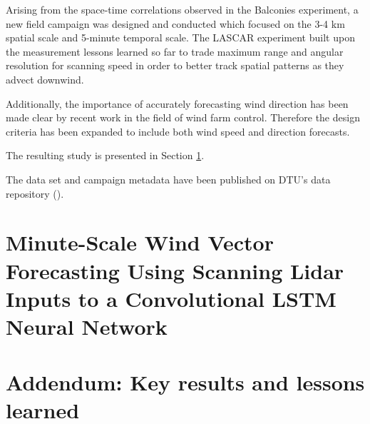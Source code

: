 Arising from the space-time correlations observed in the Balconies experiment, a new field campaign was designed and conducted which focused on the 3-4 km spatial scale and 5-minute temporal scale. The LASCAR experiment built upon the measurement lessons learned so far to trade maximum range and angular resolution for scanning speed in order to better track spatial patterns as they advect downwind.

Additionally, the importance of accurately forecasting wind direction has been made clear by recent work in the field of wind farm control. Therefore the design criteria has been expanded to include both wind speed and direction forecasts.

\noindent
The resulting study is presented in Section \ref{sec:lascar_paper}.

\noindent
The data set and campaign metadata have been published on DTU's data repository (\cite{lascar_dataset}).

\clearpage
\section{Minute-Scale Wind Vector Forecasting Using Scanning Lidar Inputs to a Convolutional LSTM Neural Network}
\label{sec:lascar_paper}



\clearpage
\section{Addendum: Key results and lessons learned}
\label{sec:lascar_addendum}
\bigskip

